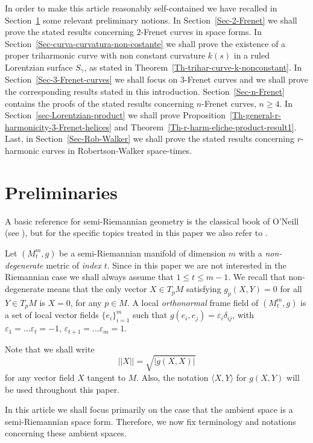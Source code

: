 \documentclass[11pt]{amsart}
\theoremstyle{plain}
\theoremstyle{definition}
\numberwithin{equation}{section}
\begin{document}
In order to make this article reasonably self-contained we have recalled in Section~\ref{Sec-preliminaries} some relevant preliminary notions. In Section~\ref{Sec-2-Frenet} we shall prove the stated results concerning $2$-Frenet curves in space forms.
In Section~\ref{Sec-curva-curvatura-non-costante} we shall prove the existence of a proper triharmonic curve with non constant curvature $k(s)$ in a ruled Lorentzian surface $S_\gamma$, as stated in Theorem~\ref{Th-trihar-curve-k-nonconstant}.
In Section~\ref{Sec-3-Frenet-curves} we shall focus on $3$-Frenet curves and  we shall prove the corresponding results stated in this introduction.
Section~\ref{Sec-n-Frenet} contains the proofs of the stated results concerning $n$-Frenet curves, $n \geq 4$. 
In Section~\ref{sec-Lorentzian-product} we shall prove Proposition~\ref{Th-general-r-harmonicity-3-Frenet-helices} and Theorem~\ref{Th-r-harm-eliche-product-result1}.
Last, in Section~\ref{Sec-Rob-Walker} we shall prove the stated results concerning $r$-harmonic curves in Robertson-Walker space-times. 

\section{Preliminaries}\label{Sec-preliminaries}

A basic reference for semi-Riemannian geometry is the classical book of O'Neill (see \cite{Neill}), but for the specific topics treated in this paper we also refer to \cite{MR4552081, Dong, Liu, MR3198740, Sasahara}.

Let $(M^m_t,g)$ be a semi-Riemannian manifold of dimension
$m$ with a \textit{non-degenerate} metric of \textit{index} $t$. Since in this paper we are not interested in the Riemannian case we shall always assume that $1 \leq t \leq m-1$. We recall that non-degenerate means that the only vector $X \in T_pM$ satisfying $g_p(X, Y ) = 0$ for all $Y \in T_pM$ 
is $X = 0$, for any $p \in M $.  A local \textit{orthonormal} frame field
of $(M^m_t,g)$ is a set of local vector fields $\{e_i\}_{i=1}^m$ such that $g(e_i, e_j) = \varepsilon_i \delta_{ij}$, with
$\varepsilon_1=\ldots \varepsilon_t=-1$, $\varepsilon_{t+1}=\ldots \varepsilon_m=1$.

Note that we shall write
\[
||X||=\sqrt{|g(X,X)|}
\]
for any vector field $X$ tangent to $M$. Also, the notation $\langle X,Y \rangle$ for $g(X,Y)$ will be used throughout this paper.


In this article we shall focus primarily on the case that the ambient space is a semi-Riemannian space form. 
Therefore, we now fix terminology and notations concerning these ambient spaces.
\end{document}
